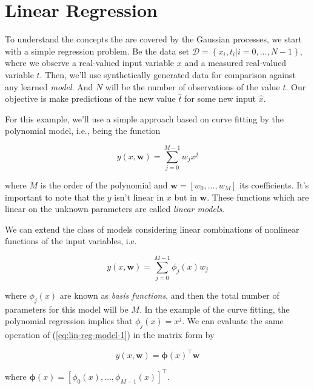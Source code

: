 \documentclass[11pt]{article} %
\begin{document}
\section{Linear Regression}

To understand the concepts the are covered by the Gaussian processes, we start with a simple regression problem. Be the data set $\mathcal{D}=\left\{ x_i,t_i|i=0,\dots,N-1 \right\}$, where we observe a real-valued input variable $x$ and a measured real-valued variable $t$. Then, we'll use synthetically generated data for comparison against any learned \textit{model}. And $N$ will be the number of observations of the value $t$. Our objective is make predictions of the new value $\hat{t}$ for some new input $\hat{x}$.



For this example, we'll use a simple approach based on curve fitting by the polynomial model, i.e., being the function

\begin{equation}
   \label{eq:lin-reg-model-1}
   y(x,\mathbf{w}) = \sum_{j=0}^{M-1} w_j x^j
\end{equation}

where $M$ is the order of the polynomial and $\mathbf{w}=\left[ w_0,\dots,w_M \right]$ its coefficients. It's important to note that the $y$ isn't linear in $x$ but in $\mathbf{w}$. These functions which are linear on the unknown parameters are called \textit{linear models}.

We can extend the class of models considering linear combinations of nonlinear functions of the input variables, i.e.

\begin{equation}
   y(x,\mathbf{w}) = \sum_{j=0}^{M-1} \phi_j (x) w_j 
   \label{eq:lin-reg-model-phi}
\end{equation}

where $\phi_j (x)$ are known as \textit{basis functions}, and then the total number of parameters for this model will be $M$. In the example of the curve fitting, the polynomial regression implies that $\phi_j(x)=x^j$. We can evaluate the same operation of (\ref{eq:lin-reg-model-1}) in the matrix form by

\begin{equation}
   y(x,\mathbf{w}) = \boldsymbol{\phi}(x)^\top  \mathbf{w}
   \label{eq:lin-reg-model-1-matrix-form}
\end{equation}

where $\boldsymbol{\phi}(x) = \left[ \phi_0(x), \dots, \phi_{M-1}(x) \right]^\top$. 
\end{document}
